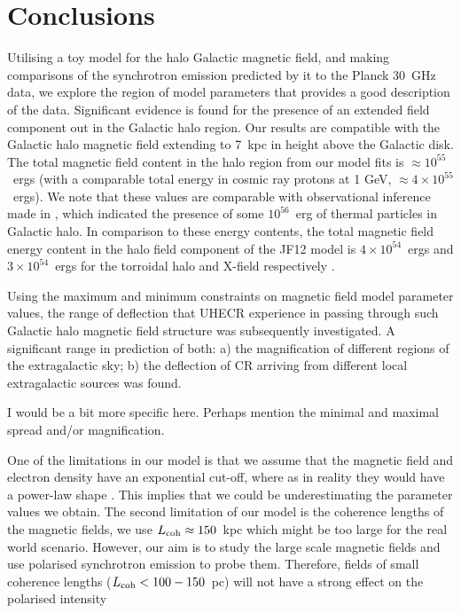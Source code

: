 \documentclass[usenatbib]{mnras}
\newcommand{\Arjen}[1]{{\color{brown}#1}}
\begin{document}
\section{Conclusions}
\label{Conclusions}
Utilising a toy model for the halo Galactic magnetic field, and making comparisons of the synchrotron emission predicted by it to the Planck 30~GHz data, we explore the region of model parameters that provides a good description of the data. Significant evidence is found for the presence of an extended field component out in the Galactic halo region. Our results are compatible with the Galactic halo magnetic field extending to 7~kpc in height above the Galactic disk. The total magnetic field content in the halo region from our model fits is $\approx 10^{55}$~ergs (with a comparable total energy in cosmic ray protons at 1 GeV, $\approx 4\times 10^{55}$~ergs). We note that these values are comparable with observational inference made in \cite{eROSITA}, which indicated the presence of some $10^{56}$~erg of thermal particles in Galactic halo. In comparison to these energy contents, the total magnetic field energy content in the halo field component of the JF12 model is $4\times 10^{54}$~ergs and $3\times  10^{54}$~ergs for the torroidal halo and X-field respectively \cite{Taylor_2019}.

Using the maximum and minimum constraints on magnetic field model parameter values, the range of deflection that UHECR experience in passing through such Galactic halo magnetic field structure was subsequently investigated. A significant range in prediction of both: a) the magnification of different regions of the extragalactic sky; b) the deflection of CR arriving from different local extragalactic sources was found.

\Arjen{I would be a bit more specific here. Perhaps mention the minimal and maximal spread and/or magnification.}

One of the limitations in our model is that we assume that the magnetic field and electron density have an exponential cut-off, where as in reality they would have a power-law shape \cite{Drury_2012} \cite{Hammurabi} \cite{Eck_2015}. This implies that we could be underestimating the parameter values we obtain. The second limitation of our model is the coherence lengths of the magnetic fields, we use $L_{\rm coh} \approx 150$~kpc which might be too large for the real world scenario. However, our aim is to study the large scale magnetic fields and use polarised synchrotron emission to probe them. Therefore, fields of small coherence lengths ($L_{\rm coh} < 100 - 150 $~pc) will not have a strong effect on the polarised intensity
\end{document}
